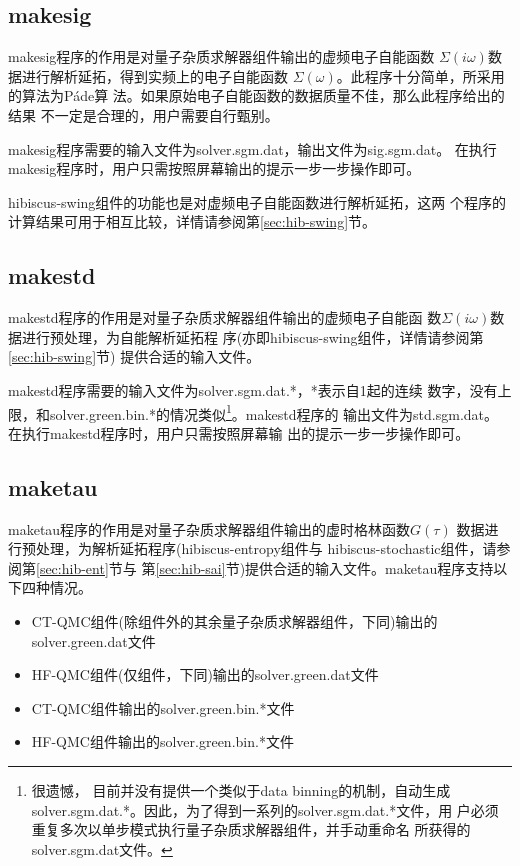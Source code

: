 \subsection{makesig}
makesig程序的作用是对量子杂质求解器组件输出的虚频电子自能函数
$\Sigma(i\omega)$数据进行解析延拓，得到实频上的电子自能函数
$\Sigma(\omega)$。此程序十分简单，所采用的算法为P\'{a}de算
法。如果原始电子自能函数的数据质量不佳，那么此程序给出的结果
不一定是合理的，用户需要自行甄别。

makesig程序需要的输入文件为solver.sgm.dat，输出文件为sig.sgm.dat。
在执行makesig程序时，用户只需按照屏幕输出的提示一步一步操作即可。

hibiscus-swing组件的功能也是对虚频电子自能函数进行解析延拓，这两
个程序的计算结果可用于相互比较，详情请参阅第\ref{sec:hib-swing}节。

\subsection{makestd}
makestd程序的作用是对量子杂质求解器组件输出的虚频电子自能函
数$\Sigma(i\omega)$数据进行预处理，为自能解析延拓程
序(亦即hibiscus-swing组件，详情请参阅第\ref{sec:hib-swing}节)
提供合适的输入文件。

makestd程序需要的输入文件为solver.sgm.dat.*，*表示自1起的连续
数字，没有上限，和solver.green.bin.*的情况类似\footnote{很遗憾，
目前{\iqist}并没有提供一个类似于data binning的机制，自动生成
solver.sgm.dat.*。因此，为了得到一系列的solver.sgm.dat.*文件，用
户必须重复多次以单步模式执行量子杂质求解器组件，并手动重命名
所获得的solver.sgm.dat文件。}。makestd程序的
输出文件为std.sgm.dat。在执行makestd程序时，用户只需按照屏幕输
出的提示一步一步操作即可。

\subsection{maketau}
maketau程序的作用是对量子杂质求解器组件输出的虚时格林函数$G(\tau)$
数据进行预处理，为解析延拓程序(hibiscus-entropy组件与
hibiscus-stochastic组件，请参阅第\ref{sec:hib-ent}节与
第\ref{sec:hib-sai}节)提供合适的输入文件。maketau程序支持以下四种情况。

\begin{itemize}
\item CT-QMC组件(除{\daisy}组件外的其余量子杂质求解器组件，下同)输出的solver.green.dat文件
\item HF-QMC组件(仅{\daisy}组件，下同)输出的solver.green.dat文件
\item CT-QMC组件输出的solver.green.bin.*文件
\item HF-QMC组件输出的solver.green.bin.*文件
\end{itemize}


